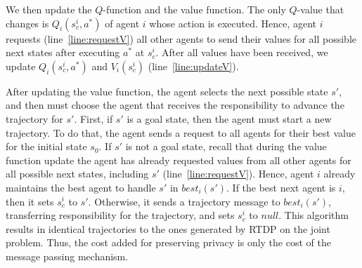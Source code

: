 \documentclass[letterpaper]{article} %
\theoremstyle{remark}
\begin{document}
We then update the $Q$-function and the value function. The only $Q$-value that changes is $Q_i(s^i_c,a^*)$ of agent $i$ whose action is executed. Hence, agent $i$ requests (line~\ref{line:requestV}) all other agents to send their values for all possible next states after executing $a^*$ at $s^i_c$. After all values have been received, we update $Q_i(s^i_c,a^*)$ and $V_i(s^i_c)$ (line~\ref{line:updateV}).

After updating the value function, the agent selects the next possible state $s'$, and then must choose the agent that receives the responsibility to advance the trajectory for $s'$. First, if $s'$ is a goal state, then the agent must start a new trajectory. To do that, the agent sends a request to all agents for their best value for the initial state $s_0$. If $s'$ is not a goal state, recall that during the value function update the agent has already requested values from all other agents for all possible next states, including $s'$ (line~\ref{line:requestV}). Hence, agent $i$ already maintains the best agent to handle $s'$ in $best_i(s')$. If the best next agent is $i$, then it sets $s^i_c$ to $s'$. Otherwise, it sends a trajectory message to $best_i(s')$, transferring responsibility for the trajectory, and sets $s^i_c$ to $null$. This algorithm results in identical trajectories to the ones generated by RTDP on the joint problem. Thus, the cost added for preserving privacy is only the cost of the message passing mechanism.
\end{document}
